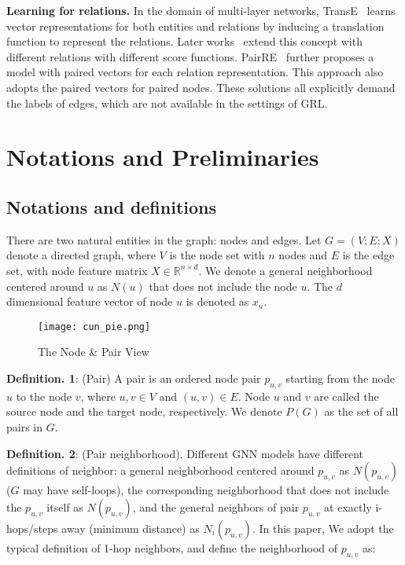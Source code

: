 \documentclass[10pt,journal,compsoc]{IEEEtran}
\begin{document}
\noindent\textbf{Learning for relations.} In the domain of multi-layer networks, TransE~\cite{TransE13} learns vector representations for both entities and relations by inducing a translation function to represent the relations. Later works~\cite{TransR15,Rotate19} extend this concept with different relations with different score functions. PairRE~\cite{PairRE} further proposes a model with paired vectors for each relation representation. This approach also adopts the paired vectors for paired nodes. These solutions all explicitly demand the labels of edges, which are not available in the settings of GRL.







\section{Notations and Preliminaries}

\subsection{Notations and definitions}

There are two natural entities in the graph: nodes and edges. Let $G = (V;E;X)$ denote a directed graph, where $V$ is the node set with $n$ nodes and $E$ is the edge set, with node feature matrix $X \in \mathbb{R}^{n \times d}$. We denote a general neighborhood centered around $u$ as ${N}(u)$ that does not include the node $u$. The $d$ dimensional feature vector of node $u$ is denoted as $x_u$.



\begin{wrapfigure}{r}{0.45\columnwidth}
\vspace{-0.25in}
\centering
\texttt{[image: cun\_pie.png]}
\caption{The Node \& Pair View}
\label{fig:nodepair}
\vspace{-0.2in}
\end{wrapfigure}






\noindent \textbf{Definition. 1}: (Pair) A pair is an ordered node pair $p_{u,v}$ starting from the node $u$ to the node $v$, where $u, v \in V$ and $(u,v) \in E$. Node $u$ and $v$ are called the source node and the target node, respectively. We denote $P(G)$ as the set of all pairs in $G$.

\noindent \textbf{Definition. 2}: (Pair neighborhood). Different GNN models have different definitions of neighbor: a general neighborhood centered around $p_{u,v}$ as $N(p_{u,v})$ ($G$ may have self-loops), the corresponding neighborhood that does not include the $p_{u,v}$ itself as $N(p_{u,v})$, and the general neighbors of pair $p_{u,v}$ at exactly i-hops/steps away (minimum distance) as $N_i(p_{u,v})$. In this paper, We adopt the typical definition of 1-hop neighbors, and define the neighborhood of $p_{u,v}$ as:
\end{document}
